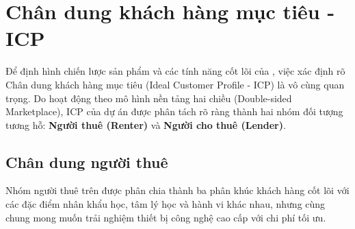 \section{Chân dung khách hàng mục tiêu - ICP}

Để định hình chiến lược sản phẩm và các tính năng cốt lõi của \projectname{}, việc xác định rõ Chân dung khách hàng mục tiêu (Ideal Customer Profile - ICP) là vô cùng quan trọng. Do \projectname{} hoạt động theo mô hình nền tảng hai chiều (Double-sided Marketplace), ICP của dự án được phân tách rõ ràng thành hai nhóm đối tượng tương hỗ: \textbf{Người thuê (Renter)} và \textbf{Người cho thuê (Lender)}.

\subsection{Chân dung người thuê}

Nhóm người thuê trên \projectname{} được phân chia thành ba phân khúc khách hàng cốt lõi với các đặc điểm nhân khẩu học, tâm lý học và hành vi khác nhau, nhưng cùng chung mong muốn trải nghiệm thiết bị công nghệ cao cấp với chi phí tối ưu.

